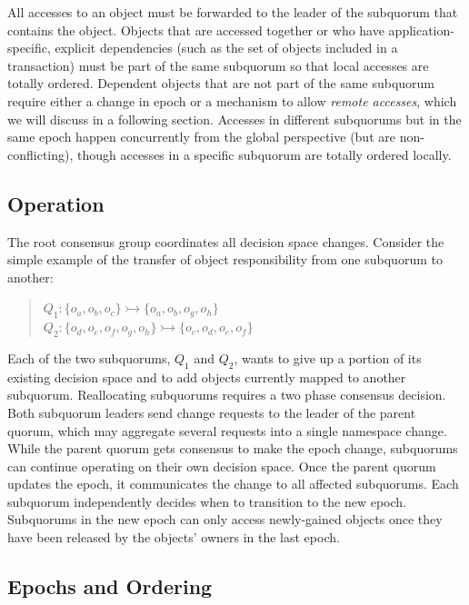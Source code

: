 \documentclass[11pt,letterpaper]{article}
\begin{document}
All accesses to an object must be forwarded to the leader of the subquorum that contains
the object.
Objects that are accessed together or who have application-specific, explicit
dependencies (such as the set of objects included in a transaction) must be part of the
same subquorum so that local accesses are totally ordered.
Dependent objects that are not part of the same subquorum require either a change in
epoch or a mechanism to allow \emph{remote accesses}, which we will discuss in a
following section.
Accesses in different subquorums but in the same epoch happen concurrently
from the global perspective (but are non-conflicting), though accesses in a
specific subquorum are totally ordered locally.

\subsection{Operation}
\vspace{-.5em}

The root consensus group coordinates all decision space changes.
Consider the simple example of the transfer of object responsibility from one subquorum
to another:

\begin{quote}
\small
   $Q_1: \{o_a,o_b,o_c\} \rightarrowtail \{o_a,o_b,o_g,o_h\}$\\
   $Q_2: \{o_d,o_e,o_f,o_g,o_h\} \rightarrowtail \{o_c,o_d,o_e,o_f\}$
\end{quote}

Each of the two subquorums, $Q_1$ and $Q_2$, wants to give up a portion of its
existing decision space and to add objects currently mapped to another subquorum.
Reallocating subquorums requires a two phase consensus decision.
Both subquorum leaders send change requests to the leader of the parent quorum, which may
aggregate several requests into a single namespace change.
While the parent quorum gets consensus to make the epoch change, subquorums can continue
operating on their own decision space.
Once the parent quorum updates the epoch, it communicates the change to all affected
subquorums.
Each subquorum independently decides when to transition to the new epoch.
Subquorums in the new epoch can only access newly-gained objects once they have been
released by the objects' owners in the last epoch.

\subsection{Epochs and Ordering}
\vspace{-.5em}
\end{document}
